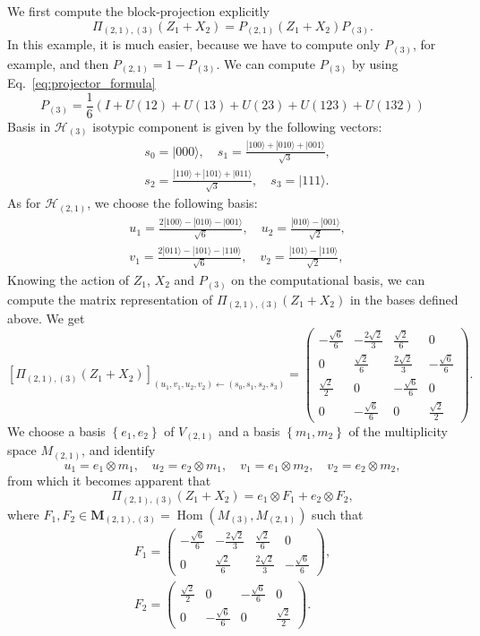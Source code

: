 \documentclass[11pt,letterpaper]{article}
\theoremstyle{plain}
\theoremstyle{plain}
\theoremstyle{plain}
\theoremstyle{plain}
\theoremstyle{plain}
\theoremstyle{plain}
\newcommand{\HH}{\mathcal{H}}
\theoremstyle{plain}
\theoremstyle{definition}
\theoremstyle{plain}
\begin{document}
We first compute the block-projection explicitly
\[
    \Pi_{(2,1),(3)}(Z_1+X_2)=P_{(2,1)} (Z_1+X_2) P_{(3)}.
\]
In this example, it is much easier, because we have to compute only $P_{(3)}$, for example, and then
$P_{(2,1)}=\mathrm{1}-P_{(3)}$. We can compute $P_{(3)}$ by using Eq.~\eqref{eq:projector_formula}
\[
    P_{(3)}=\frac{1}{6}(I+U(12)+U(13)+U(23)+U(123)+U(132))
\]
Basis in $\HH_{(3)}$ isotypic component is given by the following vectors:
\[
    \begin{aligned}
    & s_0=|000\rangle, \quad s_1=\frac{|100\rangle+|010\rangle+|001\rangle}{\sqrt{3}}, \\
    & s_2=\frac{|110\rangle+|101\rangle+|011\rangle}{\sqrt{3}}, \quad s_3=|111\rangle .
    \end{aligned}
\]
As for $\HH_{(2,1)}$, we choose the following basis:
\[
    \begin{aligned}
    &u_1=\frac{2|100\rangle-|010\rangle-|001\rangle}{\sqrt{6}}, \quad u_2=\frac{|010\rangle-|001\rangle}{\sqrt{2}},\\
    &v_1=\frac{2|011\rangle-|101\rangle-|110\rangle}{\sqrt{6}}, \quad v_2=\frac{|101\rangle-|110\rangle}{\sqrt{2}},
    \end{aligned}
\]
Knowing the action of $Z_1$, $X_2$ and $P_{(3)}$ on the computational basis, we can compute the matrix representation of $\Pi_{(2,1),(3)}(Z_1+X_2)$ in the bases defined above. We get
\[
    \left[\Pi_{(2,1),(3)}(Z_1+X_2)\right]_{\left(u_1, v_1, u_2, v_2\right) \leftarrow\left(s_0, s_1, s_2, s_3\right)}=\left(\begin{array}{cccc}
    -\frac{\sqrt{6}}{6} & -\frac{2 \sqrt{2}}{3} & \frac{\sqrt{2}}{6} & 0 \\
    0 & \frac{\sqrt{2}}{6} & \frac{2 \sqrt{2}}{3} & -\frac{\sqrt{6}}{6} \\
    \frac{\sqrt{2}}{2} & 0 & -\frac{\sqrt{6}}{6} & 0 \\
    0 & -\frac{\sqrt{6}}{6} & 0 & \frac{\sqrt{2}}{2}
    \end{array}\right).
\]
We choose a basis $\left\{e_1, e_2\right\}$ of $V_{(2,1)}$ and a basis $\left\{m_1, m_2\right\}$ of the multiplicity space $M_{(2,1)}$, and identify 
\[
    u_1=e_1 \otimes m_1, \quad u_2=e_2 \otimes m_1, \quad v_1=e_1 \otimes m_2, \quad v_2=e_2 \otimes m_2,
\]
from which it becomes apparent that
\[
    \Pi_{(2,1),(3)}(Z_1+X_2)=e_1 \otimes F_1+e_2 \otimes F_2,
\]
where $F_1, F_2 \in \mathbf{M}_{(2,1),(3)}=\operatorname{Hom}\left(M_{(3)}, M_{(2,1)}\right)$ such that
\[
    \begin{gathered}
    F_1=\left(\begin{array}{cccc}
    -\frac{\sqrt{6}}{6} & -\frac{2 \sqrt{2}}{3} & \frac{\sqrt{2}}{6} & 0 \\
    0 & \frac{\sqrt{2}}{6} & \frac{2 \sqrt{2}}{3} & -\frac{\sqrt{6}}{6}
    \end{array}\right), \\
    F_2=\left(\begin{array}{cccc}
    \frac{\sqrt{2}}{2} & 0 & -\frac{\sqrt{6}}{6} & 0 \\
    0 & -\frac{\sqrt{6}}{6} & 0 & \frac{\sqrt{2}}{2}
    \end{array}\right) .
    \end{gathered}
\]  
\end{document}
